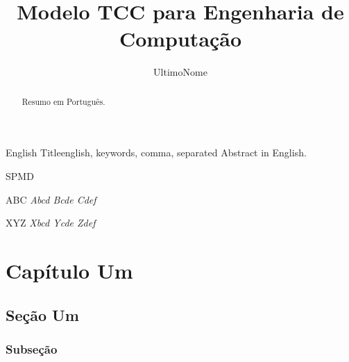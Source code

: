 \documentclass[tcc,ec]{texfurg} %
\title{Modelo TCC para Engenharia de Computação}
\author{UltimoNome}{Nome Sobrenome de}
\begin{document}

\maketitle

\sloppy

\begin{abstract}
     Resumo em Português.
\end{abstract}

\begin{englishabstract}{English Title}{english, keywords, comma, separated}
    Abstract in English.
\end{englishabstract}


\listoffigures

\listoftables

\begin{listofabbrv}{SPMD}
    \item[ABC] \textit{Abcd Bcde Cdef}
    \item[XYZ] \textit{Xbcd Ycde Zdef}
\end{listofabbrv}

\tableofcontents

  

\chapter{Capítulo Um}

\lipsum[18]

\section{Seção Um}

\lipsum[1]

\subsection{Subseção}
\end{document}
